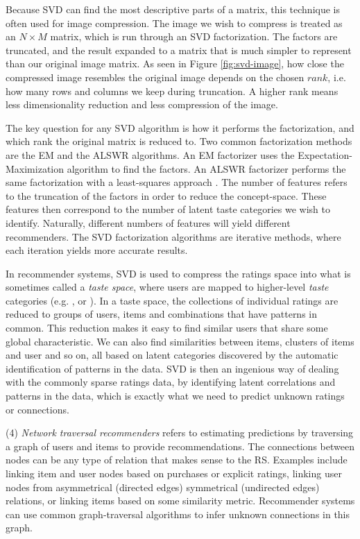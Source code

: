 Because SVD can find the most descriptive parts of a matrix, this technique is often used for image compression.
The image we wish to compress is treated as an $N \times M$ matrix, which is run through an SVD factorization.
The factors are truncated, and the result expanded to a matrix that is much simpler to represent
than our original image matrix. As seen in Figure \ref{fig:svd-image}, how close the compressed image resembles the original image
depends on the chosen $rank$, i.e. how many rows and columns we keep during truncation.
A higher rank means less dimensionality reduction and less compression of the image.

The key question for any SVD algorithm is how it performs the factorization,
and which rank the original matrix is reduced to.
Two common factorization methods are the EM and the ALSWR algorithms.
An EM factorizer uses the Expectation-Maximization algorithm to find the factors.
An ALSWR factorizer performs the same factorization with a least-squares approach \citep{Zhou2008}.
The number of features refers to the truncation of the factors in order to reduce the concept-space.
These features then correspond to the number of latent taste categories we wish to identify.
Naturally, different numbers of features will yield different recommenders.
The SVD factorization algorithms are iterative methods, where each iteration
yields more accurate results.

In recommender systems, SVD is used to compress the ratings space into what is sometimes called a \emph{taste space},
where users are mapped to higher-level \emph{taste} categories
(e.g. \citet[p5]{Ahn2004}, \citet[p4]{Brand2003} or \citet[p2]{Liu2006}).
In a taste space,
the collections of individual ratings are reduced to groups of users, items and combinations that have patterns in common.
This reduction makes it easy to find similar users that share some global characteristic.
We can also find similarities between items, clusters of items and user and so on, all based on latent categories
discovered by the automatic identification of patterns in the data.
SVD is then an ingenious way of dealing with the commonly sparse ratings data, by identifying latent correlations and patterns in the data,
which is exactly what we need to predict unknown ratings or connections.

(4) \emph{Network traversal recommenders} refers to estimating predictions by traversing a graph of users and items to provide recommendations.
The connections between nodes can be any type of relation that makes sense to the RS. Examples include linking item and user nodes
based on purchases or explicit ratings, linking user nodes from asymmetrical (directed edges) symmetrical (undirected edges) relations,
or linking items based on some similarity metric.
Recommender systems can use common graph-traversal algorithms to infer unknown connections in this graph.

